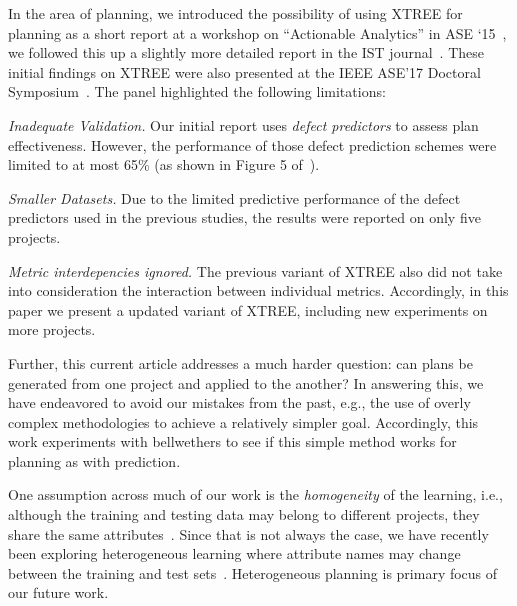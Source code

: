 

 {\color{steel} In the area of planning, we introduced the possibility of using XTREE for planning as a short report at a workshop on \enquote{Actionable Analytics} in ASE `15~\citep{krishna15}, we followed this up a slightly more detailed report in the IST journal~\citep{krishna2017less}. These initial findings on XTREE were also presented at the IEEE ASE'17 Doctoral Symposium~\citep{krishna2017b}. The panel highlighted the following limitations:
\bi[wide=0pt]
\item \textit{Inadequate Validation.} Our initial report uses \textit{defect predictors} to assess    
plan effectiveness. However, the  performance of those defect prediction schemes were limited to at most 65\% (as shown in Figure 5 of~\citep{krishna2017less}).   
\item \textit{Smaller Datasets.} Due to the limited predictive performance of the defect predictors used in the previous studies, the results were reported on only five projects.
\item \textit{Metric interdepencies ignored.} The previous variant of XTREE also did not take into consideration the interaction between individual metrics. 
\ei
Accordingly, in this paper we present a updated variant of XTREE, including new experiments on more projects.

Further, this current article     addresses a much harder question: can plans be generated from one project and applied to the another? In answering this, we have endeavored to avoid our mistakes from the past, e.g., the use of overly complex methodologies to achieve a relatively simpler goal. Accordingly, this work experiments with bellwethers to see if this simple method works for planning as with prediction.} 

One assumption across much of our work is the \textit{homogeneity} of the learning, i.e., although the training and testing data may belong to different projects, they share the same attributes~\citep{krishna16, krishna17a, krishna17b, menzies07, turhan09}. Since that is not always the case, we have recently been exploring heterogeneous learning where attribute names may change between the training and test sets~\citep{fu18}. Heterogeneous planning is primary focus of our future work.
\newpage